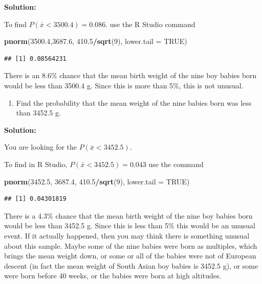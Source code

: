 \documentclass[
]{book}
\newenvironment{Shaded}{\begin{snugshade}}{\end{snugshade}}
\newcommand{\DataTypeTok}[1]{\textcolor[rgb]{0.13,0.29,0.53}{#1}}
\newcommand{\DecValTok}[1]{\textcolor[rgb]{0.00,0.00,0.81}{#1}}
\newcommand{\FloatTok}[1]{\textcolor[rgb]{0.00,0.00,0.81}{#1}}
\newcommand{\KeywordTok}[1]{\textcolor[rgb]{0.13,0.29,0.53}{\textbf{#1}}}
\newcommand{\NormalTok}[1]{#1}
\newcommand{\OperatorTok}[1]{\textcolor[rgb]{0.81,0.36,0.00}{\textbf{#1}}}
\newcommand{\OtherTok}[1]{\textcolor[rgb]{0.56,0.35,0.01}{#1}}
\providecommand{\tightlist}{%
  \setlength{\itemsep}{0pt}\setlength{\parskip}{0pt}}
\begin{document}
\textbf{Solution:}

To find \(P(\bar{x}<3500.4)=0.086\). use the R Studio command

\begin{Shaded}
\begin{Highlighting}[]
\KeywordTok{pnorm}\NormalTok{(}\FloatTok{3500.4}\NormalTok{,}\FloatTok{3687.6}\NormalTok{, }\FloatTok{410.5}\OperatorTok{/}\KeywordTok{sqrt}\NormalTok{(}\DecValTok{9}\NormalTok{), }\DataTypeTok{lower.tail =} \OtherTok{TRUE}\NormalTok{)}
\end{Highlighting}
\end{Shaded}

\begin{verbatim}
## [1] 0.08564231
\end{verbatim}

There is an 8.6\% chance that the mean birth weight of the nine boy babies born would be less than 3500.4 g. Since this is more than 5\%, this is not unusual.

\begin{enumerate}
\def\labelenumi{\alph{enumi}.}
\setcounter{enumi}{5}
\tightlist
\item
  Find the probability that the mean weight of the nine babies born was less than 3452.5 g.
\end{enumerate}

\textbf{Solution:}

You are looking for the \(P(\bar{x}<3452.5)\).

To find in R Studio, \(P(\bar{x}<3452.5)=0.043\) use the command

\begin{Shaded}
\begin{Highlighting}[]
\KeywordTok{pnorm}\NormalTok{(}\FloatTok{3452.5}\NormalTok{, }\FloatTok{3687.4}\NormalTok{, }\FloatTok{410.5}\OperatorTok{/}\KeywordTok{sqrt}\NormalTok{(}\DecValTok{9}\NormalTok{), }\DataTypeTok{lower.tail =} \OtherTok{TRUE}\NormalTok{)}
\end{Highlighting}
\end{Shaded}

\begin{verbatim}
## [1] 0.04301819
\end{verbatim}

There is a 4.3\% chance that the mean birth weight of the nine boy babies born would be less than 3452.5 g. Since this is less than 5\% this would be an unusual event. If it actually happened, then you may think there is something unusual about this sample. Maybe some of the nine babies were born as multiples, which brings the mean weight down, or some or all of the babies were not of European descent (in fact the mean weight of South Asian boy babies is 3452.5 g), or some were born before 40 weeks, or the babies were born at high altitudes.
\end{document}
